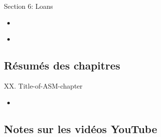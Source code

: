 \begin{ASM_chapter}
Section 6: Loans
\begin{itemize}
	\item	{}
\end{itemize}
\end{ASM_chapter}

\begin{YTB_vids}
\begin{itemize}
	\item	
\end{itemize}
\end{YTB_vids}

\subsection{Résumés des chapitres}

\begin{CHPT_SUMM_AUTO}[label = {L.-XX}]{XX. Title-of-ASM-chapter}
	\begin{itemize}
		\item	
	\end{itemize}
\end{CHPT_SUMM_AUTO}

\subsection{Notes sur les vidéos YouTube}

